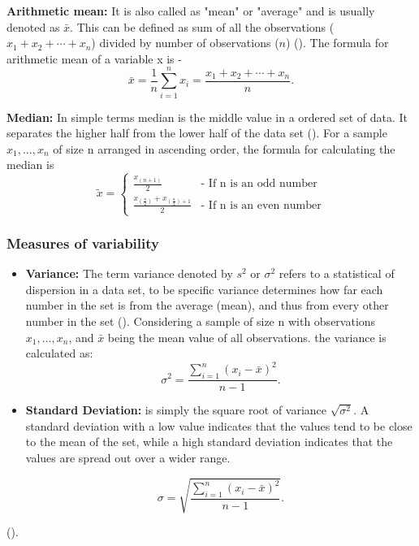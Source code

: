 \documentclass[12 pt]{scrartcl}
\begin{document}
	
	\textbf{Arithmetic mean:} It is also called as "mean" or "average" and is usually denoted as  $ {\bar {x}} $. This can be defined as sum of all the observations (${x_{1}+x_{2}+\cdots +x_{n}}$) divided by number of observations ($n$) (\cite{text}). The formula for arithmetic mean of a variable x is -
	\begin{equation*}
		{\displaystyle {\bar {x}}={\frac {1}{n}}\sum _{i=1}^{n}x_{i}={\frac {x_{1}+x_{2}+\cdots +x_{n}}{n}}}.
	\end{equation*}
	
	
	
	\textbf{Median:} In simple terms median is the middle value in a ordered set of data. It separates the higher half from the lower half of the data set (\cite{text}).  For a sample $x_{1},...,x_{n} $ of size n arranged in ascending order, the formula for calculating the median is
	\begin{equation*}
		\tilde {x} =
		\begin{cases}
			{\frac{x_{(n+1)}}{2}} & \text{- If n is an odd number}\\
			{\frac{x_{(\frac{n}{2})}+x_{(\frac{n}{2})+1}}{2}} & \text{- If 	n is an even number}
		\end{cases}
	\end{equation*}
	
	
	
	
	\subsubsection{Measures of variability}
	\begin{itemize}
		\item \textbf{Variance:} The term variance denoted by $s^2$ or $\sigma^2$ refers to a statistical of dispersion in a data set, to be specific variance determines how far each number in the set is from the average (mean), and thus from every other number in the set (\cite{Christ}). Considering a sample of size n with observations $x_{1},...,x_{n} $, and $\bar{x}$ being the mean value of all observations. the variance is calculated as: 
		\begin{equation*}
			\sigma^2 = \frac{\sum _{i=1}^{n} (x_i - \bar{x})^2}{n - 1}.
		\end{equation*}
		
		\item \textbf{Standard Deviation:} is simply the square root of variance $\sqrt {\sigma^{2}} $. A standard deviation with a low value indicates that the values tend to be close to the mean of the set, while a high standard deviation indicates that the values are spread out over a wider range.
		
		\begin{equation*}
			\sigma={\sqrt {\frac {\sum _{i=1}^{n}(x_{i}-\bar{x})^{2}}{n-1}}}.
		\end{equation*}
		
	\end{itemize}
	(\cite{Christ}).
	
\end{document}
